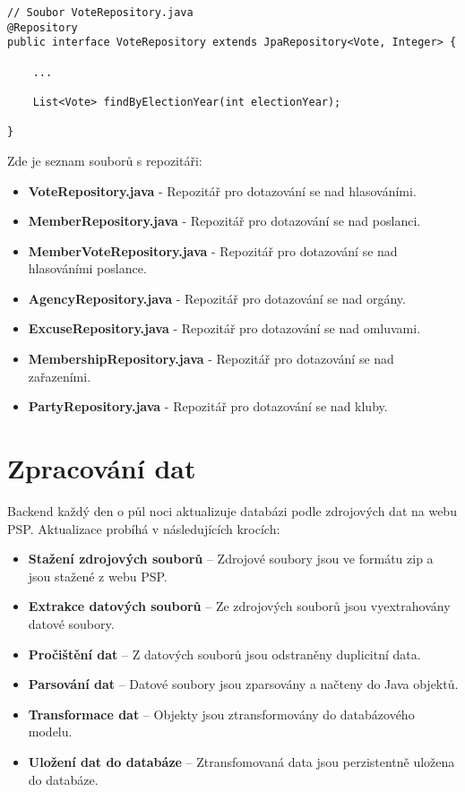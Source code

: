 \begin{lstlisting}[caption={Repozitář pro hlasování}, label={lst:be-repository-vote}, tabsize=2]
// Soubor VoteRepository.java
@Repository
public interface VoteRepository extends JpaRepository<Vote, Integer> {
	
	...
	
	List<Vote> findByElectionYear(int electionYear);
	
}
\end{lstlisting}

\noindent Zde je seznam souborů s repozitáři:

\begin{itemize}
	\item \textbf{VoteRepository.java} - Repozitář pro dotazování se nad hlasováními.
	\item \textbf{MemberRepository.java} - Repozitář pro dotazování se nad poslanci.
	\item \textbf{MemberVoteRepository.java} - Repozitář pro dotazování se nad hlasováními poslance.
	\item \textbf{AgencyRepository.java} - Repozitář pro dotazování se nad orgány.
	\item \textbf{ExcuseRepository.java} - Repozitář pro dotazování se nad omluvami.
	\item \textbf{MembershipRepository.java} - Repozitář pro dotazování se nad zařazeními.
	\item \textbf{PartyRepository.java} - Repozitář pro dotazování se nad kluby.
\end{itemize}

\section{Zpracování dat}
Backend každý den o půl noci aktualizuje databázi podle zdrojových dat na webu PSP. Aktualizace probíhá v následujících krocích:

\begin{itemize}
	\item \textbf{Stažení zdrojových souborů} -- Zdrojové soubory jsou ve formátu zip a jsou stažené z webu PSP.
	\item \textbf{Extrakce datových souborů} -- Ze zdrojových souborů jsou vyextrahovány datové soubory.
	\item \textbf{Pročištění dat} -- Z datových souborů jsou odstraněny duplicitní data.
	\item \textbf{Parsování dat} -- Datové soubory jsou zparsovány a načteny do Java objektů.
	\item \textbf{Transformace dat} --  Objekty jsou ztransformovány do databázového modelu.
	\item \textbf{Uložení dat do databáze} -- Ztransfomovaná data jsou perzistentně uložena do databáze.
\end{itemize}

